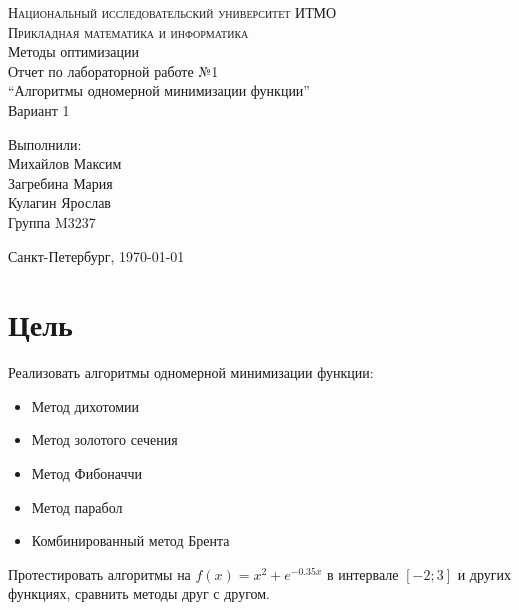 





\begin{titlepage}
    \begin{center}
        \textsc{Национальный исследовательский университет ИТМО\\
            Прикладная математика и информатика}\\[5cm]

        \huge{Методы оптимизации\\[6mm]
            \large Отчет по лабораторной работе №1\\
            ``Алгоритмы одномерной минимизации функции''\\[6mm]
            Вариант 1
            \\[3cm]
        }
    \end{center}

    \begin{flushright}
        \begin{minipage}{0.25\textwidth}
            Выполнили:\\[2mm]
            Михайлов Максим\\
            Загребина Мария\\
            Кулагин Ярослав\\[2mm]
            Группа M3237
        \end{minipage}
    \end{flushright}

    \vfill
    \begin{center}
        Санкт-Петербург, \today
    \end{center}
\end{titlepage}





\section{Цель}
Реализовать алгоритмы одномерной минимизации функции:
\begin{itemize}
    \item Метод дихотомии
    \item Метод золотого сечения
    \item Метод Фибоначчи
    \item Метод парабол
    \item Комбинированный метод Брента
\end{itemize}
Протестировать алгоритмы на \(f(x) = x^2 + e^{-0.35x}\) в интервале \([-2; 3]\) и других функциях, сравнить методы друг с другом.




